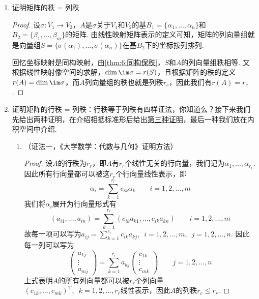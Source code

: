 \begin{enumerate}
    \item 证明矩阵的秩 = 列秩

          \begin{proof}
              设$\sigma:V_1\to V_2$，$A$是$\sigma$关于$V_1$和$V_2$的基$B_1=\{\alpha_1,\ldots,\alpha_n\}$和$B_2=\{\beta_1,\ldots,\beta_m\}$的矩阵. 由线性映射矩阵表示的定义可知，矩阵的列向量组就是向量组$S=\{\sigma(\alpha_1),\ldots,\sigma(\alpha_n)\}$在基$B_2$下的坐标按列排列.

              回忆坐标映射是同构映射，由\autoref{thm:6:同构保秩}，$S$和$A$的列向量组秩相等. 又根据线性映射像空间的求解，$\dim\im\sigma=r(S)$，且根据矩阵的秩的定义$r(A)=\dim\im\sigma$，而$A$列向量组的秩也就是列秩$r_c$，因此我们有$r(A)=r_c$.
          \end{proof}

    \item 证明矩阵的行秩 = 列秩：行秩等于列秩有四样证法，你知道么？接下来我们先给出两种证明，在介绍相抵标准形后给出\hyperref[pf:11:矩阵行秩=列秩]{第三种证明}，最后一种我们放在内积空间中介绍.
          \begin{enumerate}
              \item （证法一，《大学数学：代数与几何》证明方法）

                    \begin{proof}
                        设$A$的行秩为$r_r$，即$A$有$r_r$个线性无关的行向量，我们记为$\alpha_1,\ldots,\alpha_{r_r}$. 因此所有行向量都可以被这$r_r$个行向量线性表示，即
                        \[\alpha_i=\sum_{k=1}^{r_r}c_{ik}\alpha_k\qquad i=1,2,\ldots,m\]
                        我们将$\alpha_i$展开为行向量形式有
                        \[(a_{i1},\ldots,a_{in})=\sum_{k=1}^{r_r}(c_{ik}a_{k1},\ldots,c_{ik}a_{kn})\qquad i=1,2,\ldots,m\]
                        故每一项可以写为$a_{ij}=\displaystyle\sum_{k=1}^{r_r}c_{ik}a_{kj},\enspace i=1,2,\ldots,m,\enspace j=1,2,\ldots,n$. 因此每一列可以写为
                        \[\begin{pmatrix}
                                a_{1j} \\ \vdots \\ a_{mj}
                            \end{pmatrix}=\sum_{k=1}^{r_r}a_{kj}\begin{pmatrix}
                                c_{1k} \\ \vdots \\ c_{mk}
                            \end{pmatrix}\qquad j=1,2,\ldots,n\]
                        上式表明$A$的所有列向量都可以被$r_r$个列向量$(c_{1k},\ldots,c_{mk})^\mathrm{T},\enspace k=1,2,\ldots,r_r$线性表示，因此$A$的列秩$r_c\leqslant r_r$.


\end{proof}
\end{enumerate}
\end{enumerate}
